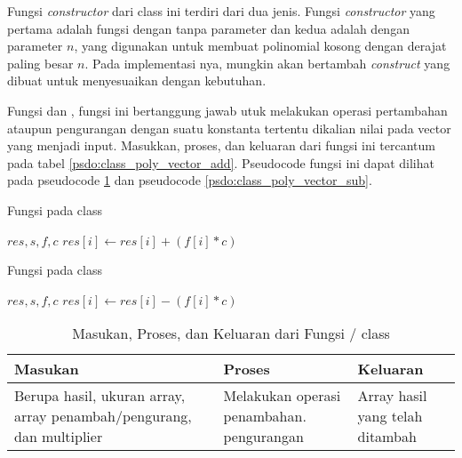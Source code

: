 Fungsi \textit{constructor} dari class ini terdiri dari dua jenis. Fungsi \textit{constructor} yang pertama adalah fungsi dengan tanpa parameter dan kedua adalah dengan parameter $ n $, yang digunakan untuk membuat polinomial kosong dengan derajat paling besar $ n $. Pada implementasi nya, mungkin akan bertambah \textit{construct} yang dibuat untuk menyesuaikan dengan kebutuhan.

Fungsi  dan , fungsi ini bertanggung jawab utuk melakukan operasi pertambahan ataupun pengurangan dengan suatu konstanta tertentu dikalian nilai pada vector yang menjadi input. Masukkan, proses, dan keluaran dari fungsi ini tercantum pada tabel \ref{psdo:class_poly_vector_add}. Pseudocode fungsi ini dapat dilihat pada pseudocode \ref{tab:class_poly_vector_add} dan pseudocode \ref{psdo:class_poly_vector_sub}.

\begin{algorithm}
	\caption{Fungsi  pada class }
	\label{psdo:class_poly_vector_add}
	\begin{algorithmic}[1]
		\Require $ res, s, f, c $
			\State $ res[i] \leftarrow res[i] + (f[i] * c) $
		\EndFor
	\end{algorithmic}
\end{algorithm}

\begin{algorithm}
	\caption{Fungsi  pada class }
	\label{psdo:class_poly_vector_sub}
	\begin{algorithmic}[1]
		\Require $ res, s, f, c $
			\State $ res[i] \leftarrow res[i] - (f[i] * c) $
		\EndFor
	\end{algorithmic}
\end{algorithm}

\begin{table}[]	
	\Centering
	\begin{tabular}{|p{3cm}|p{3cm}|p{3cm}|}
	\hline
	Masukan & Proses & Keluaran \\ \hline
	Berupa hasil, ukuran array, array penambah/pengurang, dan multiplier& Melakukan operasi penambahan. pengurangan & Array hasil yang telah ditambah\\ \hline
	\end{tabular}
	\caption{Masukan, Proses, dan Keluaran dari Fungsi  /  class }
	\label{tab:class_poly_vector_add}
\end{table}

